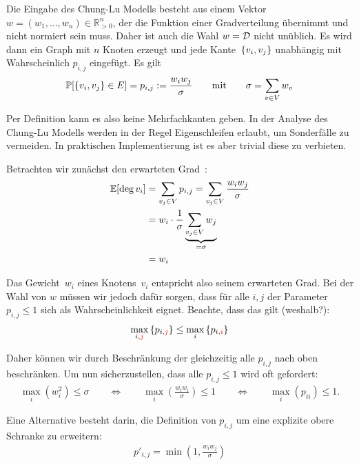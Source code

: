 Die Eingabe des Chung-Lu Modells besteht aus einem Vektor $w = (w_1, \ldots, w_n) \in \mathbb{R}_{>0}^n$, der die Funktion einer Gradverteilung übernimmt und nicht normiert sein muss.
Daher ist auch die Wahl $w = \mathcal{D}$ nicht unüblich.
Es wird dann ein Graph mit $n$ Knoten erzeugt und jede Kante~$\left\{v_i,v_j\right\}$ unabhängig mit Wahrscheinlich $p_{i,j}$ eingefügt.
Es gilt
\begin{align}
    \mathbb{P}\!\left[\left\{v_i,v_j\right\} \in E\right] = p_{i,j} := \frac{w_iw_j}{\sigma} \qquad \text{mit} \qquad \sigma = \sum_{v \in V} w_v
\end{align}

Per Definition kann es also keine Mehrfachkanten geben.
In der Analyse des Chung-Lu Modells werden in der Regel Eigenschleifen erlaubt, um Sonderfälle zu vermeiden.
In praktischen Implementierung ist es aber trivial diese zu verbieten.

Betrachten wir zunächst den erwarteten Grad~:
\begin{align}
    \mathbb{E}\!\left[\deg{v_i}\right] & = \sum_{v_j \in V} p_{i,j} = \sum_{v_j \in V} \frac{w_iw_j}{\sigma}      \\
                     & =w_i \cdot \frac{1}{\sigma} \underbrace{\sum_{v_j \in V} w_j}_{= \sigma} \\
                     & = w_i
\end{align}

Das Gewicht~$w_i$ eines Knotens~$v_i$ entspricht also seinem erwarteten Grad.
Bei der Wahl von $w$ müssen wir jedoch dafür sorgen, dass für alle $i, j$ der Parameter~$p_{i,j} \le 1$ sich als Wahrscheinlichkeit eignet.
Beachte, dass das gilt (weshalb?):
\begin{align}
    \max_{i,\textcolor{red}{j}} \left\{p_{i,\textcolor{red}{j}}\right\} \le \max_{i}\left\{p_{i,\textcolor{red}{i}}\right\}
\end{align}

Daher können wir durch Beschränkung der  gleichzeitig alle $p_{i,j}$ nach oben beschränken.
Um nun sicherzustellen, dass alle $p_{i,j} \le 1$ wird oft gefordert:
\begin{align}
    \max_i{\left(w_i^2\right)} \le \sigma
    \qquad \Leftrightarrow \qquad \max_i{\left(\frac{w_iw_i}{\sigma}\right)} \le 1
    \qquad \Leftrightarrow \qquad \max_i{\left(p_{ii}\right)} \le 1.
\end{align}

Eine Alternative besteht darin, die Definition von $p_{i,j}$ um eine explizite obere Schranke zu erweitern:
\begin{align}
    p'_{i,j} = \min(1, \frac{w_iw_j}{\sigma})
\end{align}


